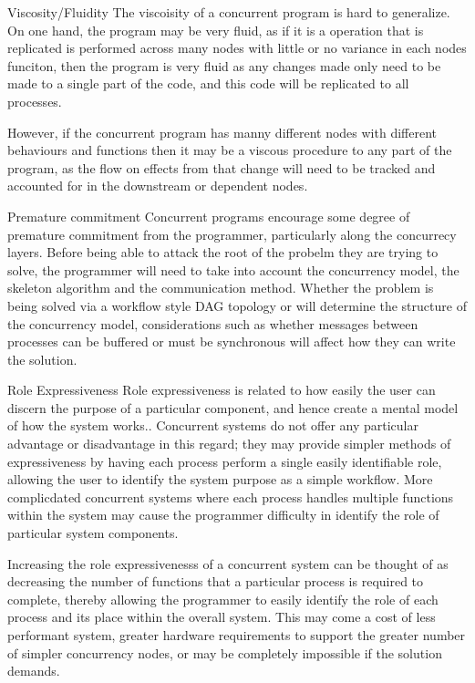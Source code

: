 \documentclass{sig-alternate}
\begin{document}
Viscosity/Fluidity
The viscoisity of a concurrent program is hard to generalize. On one hand, the program may be very fluid, as if it is a operation that is replicated is performed across many nodes with little or no variance in each nodes funciton, then the program is very fluid as any changes made only need to be made to a single part of the code, and this code will be replicated to all processes.

However, if the concurrent program  has manny different nodes with different behaviours and functions then it may be a viscous procedure to any part of the program, as the flow on effects from that change will need to be tracked and accounted for in the downstream or dependent nodes.

Premature commitment
Concurrent programs encourage some degree of premature commitment from the programmer, particularly along the concurrecy layers. Before being able to attack the root of the probelm they are trying to solve, the programmer will need to take into account the concurrency model, the skeleton algorithm and the communication method. Whether the problem is being solved via a workflow style DAG topology or will determine the structure of the concurrency model, considerations such as whether messages between processes can be buffered or must be synchronous will affect how they can write the solution.

Role Expressiveness
Role expressiveness is related to how easily the user can discern the purpose of a particular component, and hence create a mental model of how the system works.. Concurrent systems do not offer any particular advantage or disadvantage in this regard; they may provide simpler methods of expressiveness by having each process perform a single easily identifiable role, allowing the user to identify the system purpose as a simple workflow. More complicdated concurrent systems where each process handles multiple functions within the system may cause the programmer difficulty in identify the role of particular system components. 

Increasing the role expressivenesss of a concurrent system can be thought of as decreasing the number of functions that a particular process is required to complete, thereby allowing the programmer to easily identify the role of each process and its place within the overall system. This may come a cost of less performant system, greater hardware requirements to support the greater number of simpler concurrency nodes, or may be completely impossible if the solution demands. 
\end{document}
